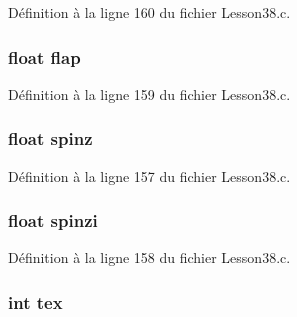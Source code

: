 Définition à la ligne 160 du fichier Lesson38.\+c.

\subsubsection[{\texorpdfstring{flap}{flap}}]{\setlength{\rightskip}{0pt plus 5cm}float flap}\hypertarget{struct___o_b_j_e_c_t_adade12d31fb9ee68283a9f6e6f87ff2b}{}\label{struct___o_b_j_e_c_t_adade12d31fb9ee68283a9f6e6f87ff2b}


Définition à la ligne 159 du fichier Lesson38.\+c.

\subsubsection[{\texorpdfstring{spinz}{spinz}}]{\setlength{\rightskip}{0pt plus 5cm}float spinz}\hypertarget{struct___o_b_j_e_c_t_a1e9781c9616932eab85f5233862f725d}{}\label{struct___o_b_j_e_c_t_a1e9781c9616932eab85f5233862f725d}


Définition à la ligne 157 du fichier Lesson38.\+c.

\subsubsection[{\texorpdfstring{spinzi}{spinzi}}]{\setlength{\rightskip}{0pt plus 5cm}float spinzi}\hypertarget{struct___o_b_j_e_c_t_a355523f4d5ded6cde610d899ccce8f19}{}\label{struct___o_b_j_e_c_t_a355523f4d5ded6cde610d899ccce8f19}


Définition à la ligne 158 du fichier Lesson38.\+c.

\subsubsection[{\texorpdfstring{tex}{tex}}]{\setlength{\rightskip}{0pt plus 5cm}int tex}\hypertarget{struct___o_b_j_e_c_t_a255fdf9357684c4a0b09bcffff73dd48}{}\label{struct___o_b_j_e_c_t_a255fdf9357684c4a0b09bcffff73dd48}


